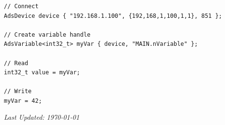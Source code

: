 \documentclass[11pt,a4paper]{article}
\begin{document}
\begin{lstlisting}[style=cppstyle]
// Connect
AdsDevice device { "192.168.1.100", {192,168,1,100,1,1}, 851 };

// Create variable handle
AdsVariable<int32_t> myVar { device, "MAIN.nVariable" };

// Read
int32_t value = myVar;

// Write
myVar = 42;
\end{lstlisting}

\vfill

\begin{center}
\textit{Last Updated: \today}
\end{center}
\end{document}

